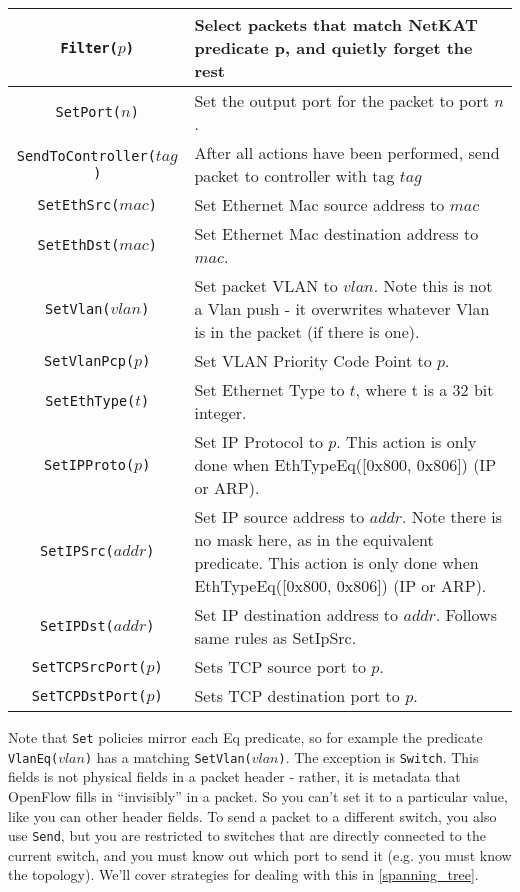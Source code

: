 \bigskip
\begin{tabularx}{6in}{|c|X|}
\hline\hline
\texttt{Filter($p$)} & Select packets that match NetKAT predicate p, and quietly forget the rest  
\\ \hline
\texttt{SetPort($n$)} & Set the output port for the packet to port $n$.    
\\ \hline
\texttt{SendToController($tag$)} & After all actions have been performed, send packet to controller with tag $tag$    
\\ \hline
\texttt{SetEthSrc($mac$)} & Set Ethernet Mac source address to $mac$
\\ \hline
\texttt{SetEthDst($mac$)} & Set Ethernet Mac destination address to $mac$.
\\ \hline
\texttt{SetVlan($vlan$)} & Set packet VLAN to $vlan$.  Note this is not a Vlan push - it overwrites whatever 
Vlan is in the packet (if there is one).  
\\ \hline
\texttt{SetVlanPcp($p$)} & Set VLAN Priority Code Point to $p$.
\\ \hline
\texttt{SetEthType($t$)} & Set Ethernet Type to $t$, where t is a 32 bit integer.
\\ \hline
\texttt{SetIPProto($p$)} & Set IP Protocol to $p$.    
This action is only done when EthTypeEq([0x800, 0x806]) (IP or ARP). 
\\ \hline
\texttt{SetIPSrc($addr$)} & Set IP source address to $addr$.  Note there is no mask here, as in the equivalent predicate.  
This action is only done when EthTypeEq([0x800, 0x806]) (IP or ARP). 
\\ \hline
\texttt{SetIPDst($addr$)} & Set IP destination address to $addr$.  
Follows same rules as SetIpSrc.
\\ \hline
\texttt{SetTCPSrcPort($p$)} & Sets TCP source port to $p$.
\\ \hline
\texttt{SetTCPDstPort($p$)} & Sets TCP destination port to $p$.  
\\ \hline\hline
\end{tabularx}
\bigskip

Note that \texttt{Set} policies mirror each Eq predicate, so for example the predicate \texttt{VlanEq($vlan$)} has a matching
\texttt{SetVlan($vlan$)}.
The exception is \texttt{Switch}.  
This fields is not physical fields in a packet header - rather, it is metadata that OpenFlow fills in ``invisibly''
in a packet.
So you can't set it to a particular value, like you can other header fields.
To send a packet to a different switch, you also use \texttt{Send}, but you are restricted to switches that are directly
connected to the current switch, and you must know out which port to send it (e.g. you must know the topology).
We'll cover strategies for dealing with this in \ref{spanning_tree}.
 
